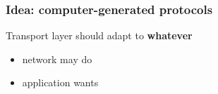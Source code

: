 \documentclass[svgnames]{beamer}
\begin{document}

\begin{frame}
\frametitle{Idea: computer-generated protocols}

\Large Transport layer should adapt to \textbf{whatever}

\begin{itemize}
\item network may do 

\item application wants 

\end{itemize}

\end{frame}
\end{document}
